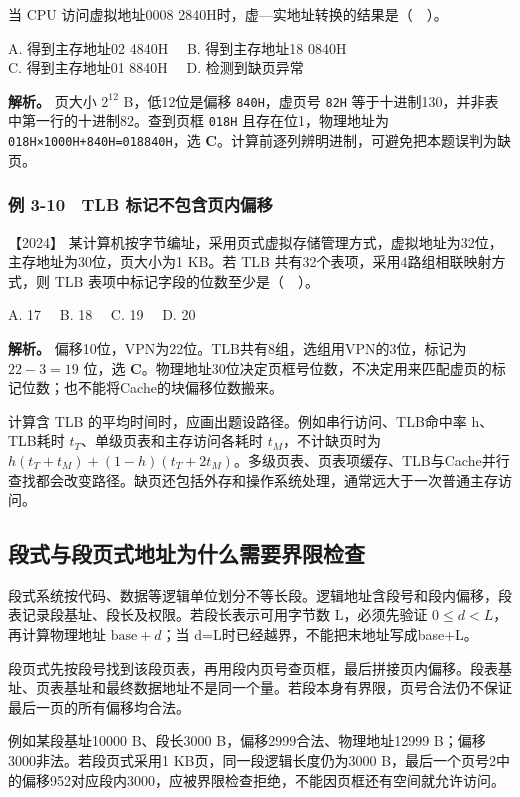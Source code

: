 当 CPU 访问虚拟地址0008 2840H时，虚---实地址转换的结果是（　）。

A. 得到主存地址02 4840H　 B. 得到主存地址18 0840H\\
C. 得到主存地址01 8840H　 D. 检测到缺页异常


\textbf{解析。} 页大小 \(2^{12}\) B，低12位是偏移 \texttt{840H}，虚页号 \texttt{82H} 等于十进制130，并非表中第一行的十进制82。查到页框 \texttt{018H} 且存在位1，物理地址为 \texttt{018H×1000H+840H=018840H}，选 \textbf{C}。计算前逐列辨明进制，可避免把本题误判为缺页。

\subsubsection{例 3-10　TLB 标记不包含页内偏移}\label{co-ex3-10}

\noindent{}【2024】 某计算机按字节编址，采用页式虚拟存储管理方式，虚拟地址为32位，主存地址为30位，页大小为1 KB。若 TLB 共有32个表项，采用4路组相联映射方式，则 TLB 表项中标记字段的位数至少是（　）。

A. 17　 B. 18　 C. 19　 D. 20


\textbf{解析。} 偏移10位，VPN为22位。TLB共有8组，选组用VPN的3位，标记为 \(22-3=19\) 位，选 \textbf{C}。物理地址30位决定页框号位数，不决定用来匹配虚页的标记位数；也不能将Cache的块偏移位数搬来。

计算含 TLB 的平均时间时，应画出题设路径。例如串行访问、TLB命中率 h、TLB耗时 \(t_T\)、单级页表和主存访问各耗时 \(t_M\)，不计缺页时为 \(h(t_T+t_M)+(1-h)(t_T+2t_M)\)。多级页表、页表项缓存、TLB与Cache并行查找都会改变路径。缺页还包括外存和操作系统处理，通常远大于一次普通主存访问。

\subsection{段式与段页式地址为什么需要界限检查}\label{co-03-13}

段式系统按代码、数据等逻辑单位划分不等长段。逻辑地址含段号和段内偏移，段表记录段基址、段长及权限。若段长表示可用字节数 L，必须先验证 \(0\le d<L\)，再计算物理地址 \(\mathrm{base}+d\)；当 d=L时已经越界，不能把末地址写成base+L。

段页式先按段号找到该段页表，再用段内页号查页框，最后拼接页内偏移。段表基址、页表基址和最终数据地址不是同一个量。若段本身有界限，页号合法仍不保证最后一页的所有偏移均合法。

例如某段基址10000 B、段长3000 B，偏移2999合法、物理地址12999 B；偏移3000非法。若段页式采用1 KB页，同一段逻辑长度仍为3000 B，最后一个页号2中的偏移952对应段内3000，应被界限检查拒绝，不能因页框还有空间就允许访问。

